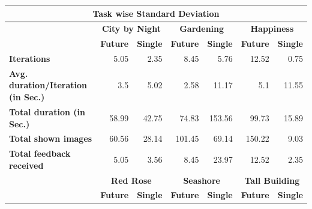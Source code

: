 \documentclass[english]{tktltiki}
\begin{document}
\begin{table}
	\small
	\begin{center}
    \begin{tabular}{|l|r|r|r|r|r|r|}
        \hline
        \multicolumn{7}{|c|}{\textbf{Task wise Standard Deviation}} \\
        \hline
        
        \multicolumn{1}{|c|}{} & \multicolumn{2}{|c|}{\textbf{City by Night}} & \multicolumn{2}{|c|}{\textbf{Gardening}} & \multicolumn{2}{|c|}{\textbf{Happiness}} \\
        \hline
        
        \multicolumn{1}{|c|}{} & \multicolumn{1}{|c|}{\textbf{Future}} & \multicolumn{1}{|c|}{\textbf{Single}} & \multicolumn{1}{|c|}{\textbf{Future}} & \multicolumn{1}{|c|}{\textbf{Single}} & \multicolumn{1}{|c|}{\textbf{Future}} & \multicolumn{1}{|c|}{\textbf{Single}} \\
        \hline
        
        \multicolumn{1}{|l|}{\textbf{Iterations}} & 5.05 & 2.35 & 8.45 & 5.76 & 12.52 & 0.75 \\
        \hline
        
        \multicolumn{1}{|l|}{\textbf{Avg. duration/Iteration (in Sec.)}} & 3.5 & 5.02 & 2.58 & 11.17 & 5.1 & 11.55 \\
        \hline
        
        \multicolumn{1}{|l|}{\textbf{Total duration (in Sec.)}} & 58.99 & 42.75 & 74.83 & 153.56 & 99.73 & 15.89 \\
        \hline
        
        \multicolumn{1}{|l|}{\textbf{Total shown images}} & 60.56 & 28.14 & 101.45 & 69.14 & 150.22 & 9.03 \\
        \hline
        
        \multicolumn{1}{|l|}{\textbf{Total feedback received}} & 5.05 & 3.56 & 8.45 & 23.97 & 12.52 & 2.35 \\
        \hline
        \hline
        \multicolumn{1}{|c|}{} & \multicolumn{2}{|c|}{\textbf{Red Rose}} & \multicolumn{2}{|c|}{\textbf{Seashore}} & \multicolumn{2}{|c|}{\textbf{Tall Building}} \\
        \hline
        
        \multicolumn{1}{|c|}{} & \multicolumn{1}{|c|}{\textbf{Future}} & \multicolumn{1}{|c|}{\textbf{Single}} & \multicolumn{1}{|c|}{\textbf{Future}} & \multicolumn{1}{|c|}{\textbf{Single}} & \multicolumn{1}{|c|}{\textbf{Future}} & \multicolumn{1}{|c|}{\textbf{Single}} \\
        \hline
        

\end{tabular}
\end{center}
\end{table}
\end{document}
